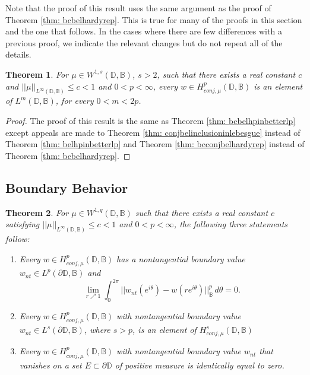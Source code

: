 \documentclass[12pt,reqno]{amsart}
\newtheorem{theorem}{Theorem}[section]
\theoremstyle{definition}
\theoremstyle{remark}
\newcommand{\p}{\partial}
\newcommand{\bc}{\mathbb{B}}
\newcommand{\disk}{\mathbb{D}}
\begin{document}
Note that the proof of this result uses the same argument as the proof of Theorem \ref{thm: bcbelhardyrep}. This is true for many of the proofs in this section and the one that follows. In the cases where there are few differences with a previous proof, we indicate the relevant changes but do not repeat all of the details. 


\begin{theorem}
    For $\mu \in W^{1,s}(\disk,\bc)$, $s>2$, such that there exists a real constant $c$ and $||\mu||_{L^\infty(\disk,\bc)} \leq c < 1$ and $0 < p < \infty$, every $w \in H^p_{conj,\mu}(\disk,\bc)$ is an element of $L^m(\disk,\bc)$, for every $0 < m < 2p$. 
\end{theorem}

\begin{proof}
The proof of this result is the same as Theorem \ref{thm: bcbelhpinbetterlp} except appeals are made to Theorem \ref{thm: conjbelinclusioninlebesgue} instead of Theorem \ref{thm: belhpinbetterlp} and Theorem \ref{thm: bcconjbelhardyrep} instead of Theorem \ref{thm: bcbelhardyrep}.

\end{proof}



    \subsection{Boundary Behavior}
    
     \begin{theorem}\label{thm: bcconjbelbv}\label{thm: bcconjbetterbvbetterleb}\label{thm: bcconjzerobdimpliesequivzero}
        For $\mu \in W^{1,q}(\disk,\bc)$ such that there exists a real constant $c$ satisfying $||\mu||_{L^\infty(\disk,\bc)} \leq c < 1$ and $0 < p < \infty$, the following three statements follow:
        	\begin{enumerate}
		\item Every $w \in H^p_{conj,\mu}(\disk,\bc)$ has a nontangential boundary value $w_{nt} \in L^p(\p \disk, \bc)$ and
        \[
        \lim_{r \nearrow 1} \int_0^{2\pi} ||w_{nt}(e^{i\theta}) - w(re^{i\theta}) ||^p_{\bc} \, d\theta  = 0. 
    \]  
	\item Every $w \in H^p_{conj,\mu}(\disk,\bc)$ with nontangential boundary value $w_{nt} \in L^s(\p\disk,\bc)$, where $s>p$, is an element of $H^s_{conj,\mu}(\disk,\bc)$
	\item Every $w \in H^p_{conj,\mu}(\disk,\bc)$ with nontangential boundary value $w_{nt}$ that vanishes on a set $E \subset \p \disk$ of positive measure is identically equal to zero. 
	\end{enumerate}
    \end{theorem}
\end{document}
